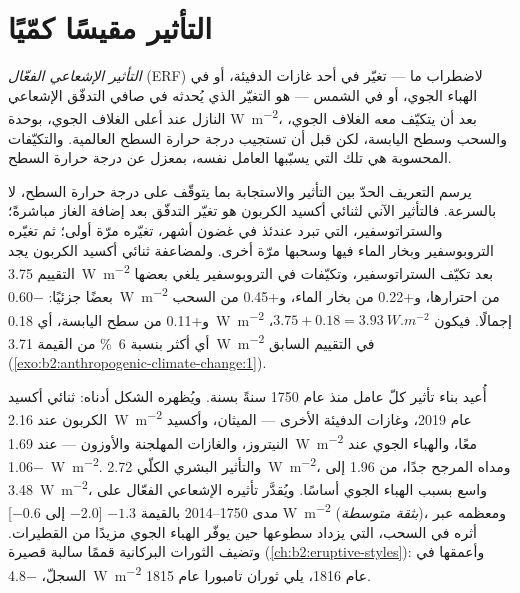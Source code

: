 \section{التأثير مقيسًا كمّيًا}\label{sec:b2:anthropogenic-climate-change:forcing}

\begin{definition}\label{def:b2:anthropogenic-climate-change:erf}
\emph{التأثير الإشعاعي الفعّال} (ERF) لاضطراب ما
--- تغيّر في أحد غازات الدفيئة، أو في الهباء الجوي، أو في الشمس --- هو التغيّر الذي يُحدثه في صافي
التدفّق الإشعاعي النازل عند أعلى الغلاف الجوي، بوحدة \unit{W.m^{-2}}، بعد أن يتكيّف معه الغلاف الجوي،
والسحب وسطح اليابسة، لكن قبل أن تستجيب درجة حرارة السطح العالمية. والتكيّفات المحسوبة هي
تلك التي يسبّبها العامل نفسه، بمعزل عن درجة حرارة
السطح.
\end{definition}

يرسم التعريف الحدّ بين التأثير والاستجابة بما يتوقّف على درجة حرارة السطح، لا
بالسرعة. فالتأثير الآني لثنائي أكسيد الكربون هو تغيّر التدفّق بعد إضافة الغاز مباشرةً؛
والستراتوسفير، التي تبرد عندئذ في غضون أشهر، تغيّره مرّة أولى؛ ثم
تغيّره التروبوسفير وبخار الماء فيها وسحبها مرّة أخرى. ولمضاعفة ثنائي أكسيد
الكربون يجد التقييم \qty{3.75}{W.m^{-2}} بعد تكيّف الستراتوسفير،
وتكيّفات في التروبوسفير يلغي بعضها بعضًا جزئيًا: \qty{-0.60}{W.m^{-2}} من احترارها، و+0.22
من بخار الماء، و+0.45 من السحب و+0.11 من سطح اليابسة، أي \qty{+0.18}{W.m^{-2}} إجمالًا.
فيكون  $3.75 + 0.18 = \qty{3.93}{W.m^{-2}}$، أي أكثر بنسبة \qty{6}{\percent} من
القيمة \qty{3.71}{W.m^{-2}} في التقييم السابق (\cref{exo:b2:anthropogenic-climate-change:1}).

أُعيد بناء تأثير كلّ عامل منذ عام 1750 سنةً بسنة. ويُظهره الشكل أدناه:
ثنائي أكسيد الكربون عند \qty{2.16}{W.m^{-2}} عام 2019، وغازات الدفيئة الأخرى --- الميثان،
وأكسيد النيتروز، والغازات المهلجنة والأوزون --- عند \qty{1.69}{W.m^{-2}} معًا،
والهباء الجوي عند \qty{-1.06}{W.m^{-2}}. والتأثير البشري الكلّي \qty{2.72}{W.m^{-2}}، ومداه
المرجح جدًا، من 1.96 إلى \qty{3.48}{W.m^{-2}}، واسع بسبب الهباء الجوي أساسًا. ويُقدَّر تأثيره الإشعاعي الفعّال على مدى
1750--2014 بالقيمة $-1.3$ [$-2.0$ إلى $-0.6$] \unit{W.m^{-2}} (\emph{بثقة متوسطة})،
ومعظمه عبر أثره في السحب، التي يزداد سطوعها حين يوفّر الهباء الجوي مزيدًا من القطيرات.
وتضيف الثورات البركانية قممًا سالبة قصيرة (\cref{ch:b2:eruptive-styles}): وأعمقها في
السجلّ، \qty{-4.8}{W.m^{-2}} عام 1816، يلي ثوران تامبورا عام 1815.

